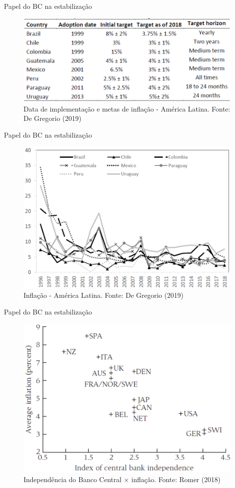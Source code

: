 \documentclass[10pt]{beamer}
\begin{document}
\begin{frame}
    {Papel do BC na estabilização}
    \begin{figure}
        \includegraphics[width=.9\textwidth]{./figures/aula15_fig8.PNG}
        \caption{Data de implementação e metas de inflação - América Latina. Fonte: De Gregorio (2019)}
    \end{figure}
\end{frame}

\begin{frame}
    {Papel do BC na estabilização}
    \begin{figure}
        \includegraphics[width=.65\textwidth]{./figures/aula15_fig9.PNG}
        \caption{Inflação - América Latina. Fonte: De Gregorio (2019)}
    \end{figure}
\end{frame}

\begin{frame}
    {Papel do BC na estabilização}
    \begin{figure}
        \includegraphics[width=.6\textwidth]{./figures/aula15_fig10.PNG}
        \caption{Independência do Banco Central $\times$ inflação. Fonte: Romer (2018)}
    \end{figure}
\end{frame}
\end{document}
